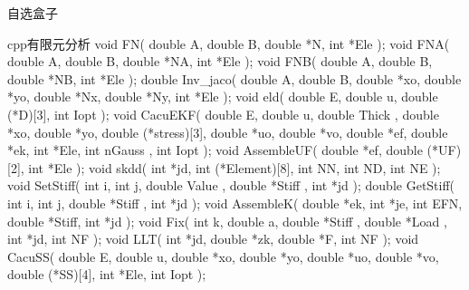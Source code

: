 \documentclass[color=orange]{textbook-cn}%
\begin{document}
\begin{box6}{自选盒子}
\lipsum[2][1-3]
\end{box6}




\begin{CodeBox}{cpp}{有限元分析}
void FN( double A, double B, double *N, int *Ele );
void FNA( double A, double B, double *NA, int *Ele );
void FNB( double A, double B, double *NB, int *Ele );
double Inv_jaco( double A, double B, double *xo, double *yo, double *Nx, double *Ny, int *Ele );
void eld( double E, double u, double (*D)[3], int Iopt );
void CacuEKF( double E, double u, double Thick , double *xo, double *yo, double (*stress)[3], double *uo, double *vo, double *ef, double *ek, int *Ele, int nGauss , int Iopt );
void AssembleUF( double *ef, double (*UF)[2], int *Ele );
void skdd( int *jd, int (*Element)[8], int NN, int ND, int NE );
void SetStiff( int i, int j, double Value , double *Stiff , int *jd );
double GetStiff( int i, int j, double *Stiff , int *jd );
void AssembleK( double *ek, int *je, int EFN, double *Stiff, int *jd );
void Fix( int k, double a, double *Stiff , double *Load , int *jd, int NF );
void LLT( int *jd, double *zk, double *F, int NF );
void CacuSS( double E, double u, double *xo, double *yo, double *uo, double *vo, double (*SS)[4], int *Ele, int Iopt );
\end{CodeBox}














\makespine[1.02cm]
\end{document}
